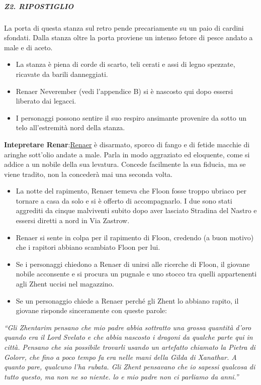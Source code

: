 \documentclass{article}
\begin{document}
                        \subparagraph{Z2. RIPOSTIGLIO}
                        La porta di questa stanza sul retro pende precariamente su un paio di cardini sfondati. Dalla stanza oltre la porta proviene un intenso fetore di pesce andato a male e di aceto. 

                        \begin{itemize}
                            \item La stanza è piena di corde di scarto, teli cerati e assi di legno spezzate, ricavate da barili danneggiati.
                            \item Renaer Neverember (vedi l'appendice B) si è nascosto qui dopo essersi liberato dai legacci.
                            \item I personaggi possono sentire il suo respiro ansimante provenire da sotto un telo all'estremità nord della stanza.
                        \end{itemize}

\textbf{Intepretare Renar}:\hyperlink{Renaer}{Renaer} è disarmato, sporco di fango e di fetide macchie di aringhe sott'olio andate a male. Parla in modo aggraziato ed eloquente, come si addice a un nobile della sua levatura. Concede facilmente la sua fiducia, ma se viene tradito, non la concederà mai una seconda volta.

\begin{itemize}
    \item La notte del rapimento, Renaer temeva che Floon fosse troppo ubriaco per tornare a casa da solo e si è offerto di accompagnarlo. I due sono stati aggrediti da cinque malviventi subito dopo aver lasciato Stradina del Nastro e essersi diretti a nord in Via Zastrow.
    \item Renaer si sente in colpa per il rapimento di Floon, credendo (a buon motivo) che i rapitori abbiano scambiato Floon per lui.
    \item Se i personaggi chiedono a Renaer di unirsi alle ricerche di Floon, il giovane nobile acconsente e si procura un pugnale e uno stocco tra quelli appartenenti agli Zhent uccisi nel magazzino.
    \item Se un personaggio chiede a Renaer perché gli Zhent lo abbiano rapito, il giovane risponde sinceramente con queste parole:
\end{itemize}


\textit{“Gli Zhentarim pensano che mio padre abbia sottratto
una grossa quantità d'oro quando era il Lord Svelato
e che abbia nascosto i dragoni da qualche parte qui
in città. Pensano che sia possibile trovarli usando un
artefatto chiamato la Pietra di Golorr, che fino a poco
tempo fa era nelle mani della Gilda di Xanathar. A quanto
pare, qualcuno l'ha rubata. Gli Zhent pensavano che io
sapessi qualcosa di tutto questo, ma non ne so niente. lo
e mio padre non ci parliamo da anni.”}
\end{document}
